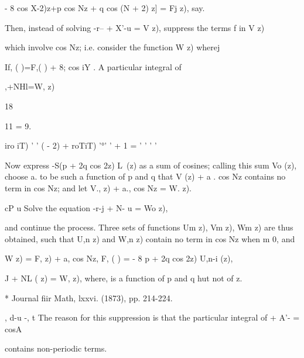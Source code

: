 - 8 cos X-2)z+p cos Nz + q cos (N + 2) z] = Fj z), say.

Then, instead of solving -r-- + X'-u = V z), suppress the terms f in V
z)

which involve cos Nz; i.e. consider the function W z) wherej

If, ( )=F,( ) + 8; cos iY . A particular integral of

,+NHl=W, z)

18

11 = 9.

iro iT) ' ' ( - 2) + roTiT) '°' ' + 1 = ' ' ' ' 

Now express -S(p + 2q cos 2z) L\ (z) as a sum of cosines; calling
this sum Vo (z), choose a. to be such a function of p and q that V (z)
+ a . cos Nz contains no term in cos Nz; and let V., z) + a., cos Nz
= W. z).

cP u Solve the equation -r-j + N- u = Wo z),

and continue the process. Three sets of functions Um z), Vm z), Wm z)
are thus obtained, such that U,n z) and W,n z) contain no term in cos
Nz when m 0, and

W z) = F, z) + a, cos Nz, F, ( ) = - 8 p + 2q cos 2z) U,n-i (z),

 J + NL ( z) = W, z), where, is a function of p and q hut not of z.

* Journal fiir Math, lxxvi. (1873), pp. 214-224.

, d-u -, t The reason for this suppression is that the particular
integral of + A'- = cosA

contains non-periodic terms.

